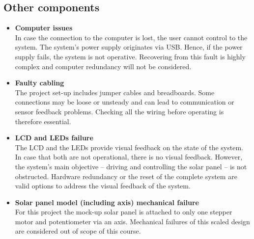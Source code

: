 \subsection{Other components}
\begin{itemize}
    \item \textbf{Computer issues}\\
    In case the connection to the computer is lost, the user cannot control to the system. The system's power supply originates via USB. Hence, if the power supply fails, the system is not operative. Recovering from this fault is highly complex and computer redundancy will not be considered.
    
    \item \textbf{Faulty cabling}\\
    The project set-up includes jumper cables and breadboards. Some connections may be loose or unsteady and can lead to communication or sensor feedback problems. Checking all the wiring before operating is therefore essential. 
    
    \item \textbf{LCD and LEDs failure}\\
    The LCD and the LEDs provide visual feedback on the state of the system. In case that both are not operational, there is no visual feedback. However, the system's main objective -- driving and controlling the solar panel -- is not obstructed. Hardware redundancy or the reset of the complete system are valid options to address the visual feedback of the system.
    
    \item \textbf{Solar panel model (including axis) mechanical failure}\\
    For this project the mock-up solar panel is attached to only one stepper motor and potentiometer via an axis. Mechanical failures of this scaled design are considered out of scope of this course.
\end{itemize}

 
 